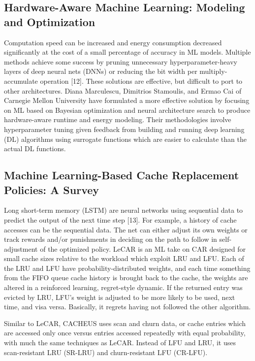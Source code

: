 \documentclass[conference]{IEEEtran}
\begin{document}
\subsection{Hardware-Aware Machine Learning: Modeling and Optimization}
Computation speed can be increased and energy consumption decreased significantly at the cost of a small percentage of accuracy in ML models.  Multiple methods achieve some success by pruning unnecessary hyperparameter-heavy layers of deep neural nets (DNNs) or reducing the bit width per multiply-accumulate operation [12].  These solutions are effective, but difficult to port to other architectures.  Diana Marculescu, Dimitrios Stamoulis, and Ermao Cai of Carnegie Mellon University have formulated a more effective solution by focusing on ML based on Bayesian optimization and neural architecture search to produce hardware-aware runtime and energy modeling.  Their methodologies involve hyperparameter tuning given feedback from building and running deep learning (DL) algorithms using surrogate functions which are easier to calculate than the actual DL functions. 

\subsection{Machine Learning-Based Cache Replacement Policies: A Survey}
Long short-term memory (LSTM) are neural networks using sequential data to predict the output of the next time step [13].  For example, a history of cache accesses can be the sequential data.  The net can either adjust its own weights or track rewards and/or punishments in deciding on the path to follow in self-adjustment of the optimized policy.  LeCAR is an ML take on CAR designed for small cache sizes relative to the workload which exploit LRU and LFU.  Each of the LRU and LFU have probability-distributed weights, and each time something from the FIFO queue cache history is brought back to the cache, the weights are altered in a reinforced learning, regret-style dynamic.  If the returned entry was evicted by LRU, LFU’s weight is adjusted to be more likely to be used, next time, and visa versa.  Basically, it regrets having not followed the other algorithm. 

Similar to LeCAR, CACHEUS uses scan and churn data, or cache entries which are accessed only once versus entries accessed repeatedly with equal probability, with much the same techniques as LeCAR.  Instead of LFU and LRU, it uses scan-resistant LRU (SR-LRU) and churn-resistant LFU (CR-LFU). 
\end{document}
